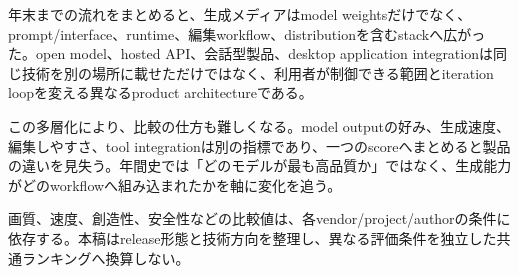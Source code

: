 年末までの流れをまとめると、生成メディアはmodel weightsだけでなく、prompt/interface、runtime、編集workflow、distributionを含むstackへ広がった。open model、hosted API、会話型製品、desktop application integrationは同じ技術を別の場所に載せただけではなく、利用者が制御できる範囲とiteration loopを変える異なるproduct architectureである。\autocite{src-091bbe9dbf4e,src-096341c0ccf6,src-0b410c70bfc7,src-18f22707bf78,src-2b694ab9a461,src-2c97fc5583a3,src-317afaba6510,src-9bc8e7751f80,src-9da0d929aa45,src-a4f61fbe35c5,src-ba80e5e27a11,src-e79065444906}


この多層化により、比較の仕方も難しくなる。model outputの好み、生成速度、編集しやすさ、tool integrationは別の指標であり、一つのscoreへまとめると製品の違いを見失う。年間史では「どのモデルが最も高品質か」ではなく、生成能力がどのworkflowへ組み込まれたかを軸に変化を追う。\autocite{src-091bbe9dbf4e,src-18f22707bf78,src-2b694ab9a461,src-317afaba6510,src-9bc8e7751f80,src-9da0d929aa45,src-a4f61fbe35c5,src-ba80e5e27a11,src-e79065444906}


\begin{claimboundary}
画質、速度、創造性、安全性などの比較値は、各vendor/project/authorの条件に依存する。本稿はrelease形態と技術方向を整理し、異なる評価条件を独立した共通ランキングへ換算しない。\autocite{src-9bc8e7751f80,src-ba80e5e27a11}
\end{claimboundary}
